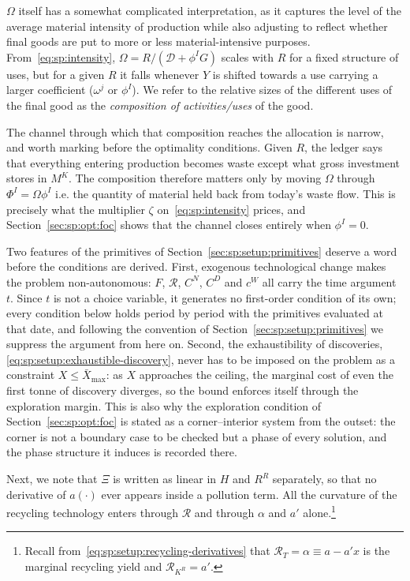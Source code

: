 $\Omega$ itself has a somewhat complicated interpretation, as it captures the level of the average material intensity of production while also adjusting to reflect whether final goods are put to more or less material-intensive purposes. From~\eqref{eq:sp:intensity}, $\Omega=R/\left(\mathcal D+\phi^IG\right)$ scales with $R$ for a fixed structure of uses, but for a given $R$ it falls whenever $Y$ is shifted towards a use carrying a larger coefficient ($\omega^j$ or $\phi^I$). We refer to the relative sizes of the different uses of the final good as the \textit{composition of activities/uses} of the good.

The channel through which that composition reaches the allocation is narrow, and worth marking before the optimality conditions. Given $R$, the ledger says that everything entering production becomes waste except what gross investment stores in $M^K$. The composition therefore matters only by moving $\Omega$ through $\Phi^I=\Omega\phi^I$ i.e. the quantity of material held back from today's waste flow. This is precisely what the multiplier $\zeta$ on~\eqref{eq:sp:intensity} prices, and Section~\ref{sec:sp:opt:foc} shows that the channel closes entirely when $\phi^I=0$.

Two features of the primitives of Section~\ref{sec:sp:setup:primitives} deserve a word before the conditions are derived. First, exogenous technological change makes the problem non-autonomous: $F$, $\mathcal R$, $C^N$, $C^D$ and $c^W$ all carry the time argument $t$. Since $t$ is not a choice variable, it generates no first-order condition of its own; every condition below holds period by period with the primitives evaluated at that date, and following the convention of Section~\ref{sec:sp:setup:primitives} we suppress the argument from here on. Second, the exhaustibility of discoveries, \eqref{eq:sp:setup:exhaustible-discovery}, never has to be imposed on the problem as a constraint $X\le\bar X_{\max}$: as $X$ approaches the ceiling, the marginal cost of even the first tonne of discovery diverges, so the bound enforces itself through the exploration margin. This is also why the exploration condition of Section~\ref{sec:sp:opt:foc} is stated as a corner--interior system from the outset: the corner is not a boundary case to be checked but a phase of every solution, and the phase structure it induces is recorded there.


Next, we note that $\Xi$ is written as linear in $H$ and $R^R$ separately, so that no derivative of $a(\cdot)$ ever appears inside a pollution term. All the curvature of the recycling
technology enters through $\mathcal R$ and through $\alpha$ and $a'$ alone.\footnote{Recall
from~\eqref{eq:sp:setup:recycling-derivatives} that $\mathcal R_T=\alpha\equiv a-a'x$ is the marginal
recycling yield and $\mathcal R_{K^R}=a'$.}


